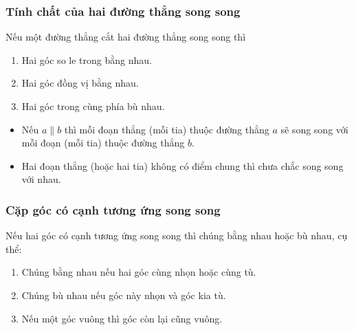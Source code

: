 \subsubsection{Tính chất của hai đường thẳng song song}
Nếu một đường thẳng cắt hai đường thẳng song song thì 
\begin{enumerate}
	\item Hai góc so le trong bằng nhau.
	\item Hai góc đồng vị bằng nhau.
	\item Hai góc trong cùng phía bù nhau.
\end{enumerate}
\begin{note}\hfill
	\begin{itemize}
		\item Nếu $a\parallel b$ thì mỗi đoạn thẳng (mỗi tia) thuộc đường thẳng $a$ sẽ song song với mỗi đoạn (mỗi tia) thuộc đường thẳng $b$.
		\item Hai đoạn thẳng (hoặc hai tia) không có điểm chung thì chưa chắc song song với nhau.
	\end{itemize}
\end{note}
\subsubsection{Cặp góc có cạnh tương ứng song song}
Nếu hai góc có cạnh tương ứng song song thì chúng bằng nhau hoặc bù nhau, cụ thể: 
\begin{enumerate}
	\item Chúng bằng nhau nếu hai góc cùng nhọn hoặc cùng tù.
	\item Chúng bù nhau nếu góc này nhọn và góc kia tù.
	\item Nếu một góc vuông thì góc còn lại cũng vuông.
\end{enumerate}
